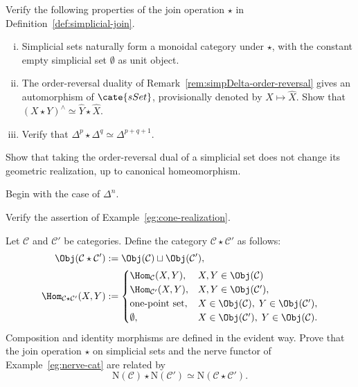 	\item Verify the following properties of the join operation $\star$ in
	Definition~\ref{def:simplicial-join}.
	\begin{enumerate}[(i)]
		\item Simplicial sets naturally form a monoidal category under $\star$,
		with the constant empty simplicial set $\emptyset$ as unit object.
		\item The order-reversal duality of
		Remark~\ref{rem:simpDelta-order-reversal} gives an automorphism of
		$\cate{sSet}$, provisionally denoted by $X\mapsto\hat{X}$. Show that
		$(X\star Y)^{\wedge}\simeq\hat{Y}\star\hat{X}$.
		\item Verify that
		$\Delta^p\star\Delta^q\simeq\Delta^{p+q+1}$.
	\end{enumerate}

	\item Show that taking the order-reversal dual of a simplicial set does
	not change its geometric realization, up to canonical homeomorphism.
	\begin{hint}
		Begin with the case of $\Delta^n$.
	\end{hint}

	\item Verify the assertion of Example~\ref{eg:cone-realization}.

	\item Let $\mathcal{C}$ and $\mathcal{C}'$ be categories. Define the
	category $\mathcal{C}\star\mathcal{C}'$ as follows:
	\begin{align*}
		\Obj(\mathcal{C} \star \mathcal{C}') & := \Obj(\mathcal{C}) \sqcup \Obj(\mathcal{C}'), \\
		\Hom_{\mathcal{C} \star \mathcal{C}'}(X, Y) & := \begin{cases}
			\Hom_{\mathcal{C}}(X, Y), & X, Y \in \Obj(\mathcal{C}) \\
			\Hom_{\mathcal{C}'}(X, Y), & X, Y \in \Obj(\mathcal{C}'), \\
			\text{one-point set}, & X \in \Obj(\mathcal{C}), \; Y \in \Obj(\mathcal{C}'), \\
			\emptyset, & X \in \Obj(\mathcal{C}'), \; Y \in \Obj(\mathcal{C}).
		\end{cases}
	\end{align*}
	Composition and identity morphisms are defined in the evident way. Prove
	that the join operation $\star$ on simplicial sets and the nerve functor of
	Example~\ref{eg:nerve-cat} are related by
	\[ \mathrm{N}(\mathcal{C}) \star \mathrm{N}(\mathcal{C}') \simeq \mathrm{N}(\mathcal{C} \star \mathcal{C}'). \]

